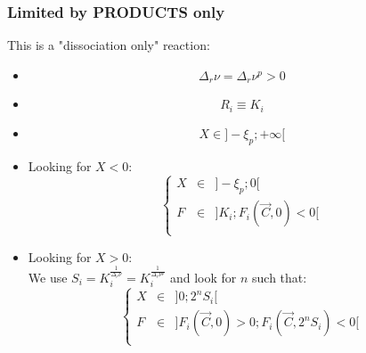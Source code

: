 \documentclass[aps,12pt]{revtex4}
\begin{document}
\subsubsection{Limited by PRODUCTS only}
This is a "dissociation only" reaction:
\begin{itemize}
\item
$$
	\Delta_r \nu =  \Delta_r \nu^p > 0 
$$
\item
$$
	R_i \equiv K_i
$$
\item
$$
	X \in \rbrack -\xi_p; +\infty \lbrack
$$
\item Looking for $X<0$:
$$
 \left\lbrace
 \begin{array}{rcl}
 	X &\in& \rbrack -\xi_p; 0 \lbrack\\
	F &\in& \rbrack K_i; F_i(\vec{C},0)<0 \lbrack\\
\end{array}
\right.
$$
\item Looking for $X>0$:\\
 We use $S_i=K_i^{\frac{1}{\Delta_r \nu}}=K_i^{\frac{1}{\Delta_r \nu^p}}$
 and look for $n$ such that:
 $$
 	\left\lbrace
 \begin{array}{rcl}
 	X &\in& \rbrack 0; 2^n S_i\lbrack\\
	F &\in& \rbrack F_i(\vec{C},0)>0; F_i(\vec{C},2^nS_i)<0 \lbrack\\
\end{array}
\right.
 $$



\end{itemize}
	
\end{document}
